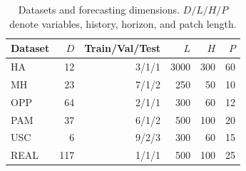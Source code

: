 \begin{table}[t]
\centering
\setlength{\tabcolsep}{4pt}
\caption{Datasets and forecasting dimensions. $D/L/H/P$ denote variables,
history, horizon, and patch length.}
\label{tab:v665-data-main}
\begin{tabular}{@{}lrrrrr@{}}
\toprule
Dataset & $D$ & Train/Val/Test & $L$ & $H$ & $P$ \\
\midrule
HA   & 12  & 3/1/1 & 3000 & 300 & 60 \\
MH   & 23  & 7/1/2 & 250  & 50  & 10 \\
OPP  & 64  & 2/1/1 & 300  & 60  & 12 \\
PAM  & 37  & 6/1/2 & 500  & 100 & 20 \\
USC  & 6   & 9/2/3 & 300  & 60  & 15 \\
REAL & 117 & 1/1/1 & 500  & 100 & 25 \\
\bottomrule
\end{tabular}
\end{table}

